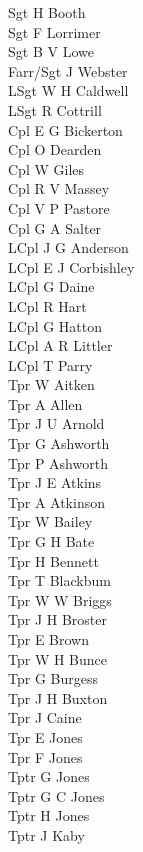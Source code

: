 \begin{multicols}{3}
  \small
  \noindent
  Sgt H Booth \\
  Sgt F Lorrimer \\
  Sgt B V Lowe \\
  Farr/Sgt J Webster \\
  LSgt W H Caldwell \\
  LSgt R Cottrill \\
  Cpl E G Bickerton \\
  Cpl O Dearden \\
  Cpl W Giles \\
  Cpl R V Massey \\
  Cpl V P Pastore \\
  Cpl G A Salter \\
  LCpl J G Anderson \\
  LCpl E J Corbishley \\
  LCpl G Daine \\
  LCpl R Hart \\
  LCpl G Hatton \\
  LCpl A R Littler \\
  LCpl T Parry \\
  Tpr W Aitken \\
  Tpr A Allen \\
  Tpr J U Arnold \\
  Tpr G Ashworth \\
  Tpr P Ashworth \\
  Tpr J E Atkins \\
  Tpr A Atkinson \\
  Tpr W Bailey \\
  Tpr G H Bate \\
  Tpr H Bennett \\
  Tpr T Blackbum \\
  Tpr W W Briggs \\
  Tpr J H Broster \\
  Tpr E Brown \\
  Tpr W H Bunce \\
  Tpr G Burgess \\
  Tpr J H Buxton \\
  Tpr J Caine \\
  Tpr E Jones \\
  Tpr F Jones \\
  Tptr G Jones \\
  Tptr G C Jones \\
  Tptr H Jones \\
  Tptr J Kaby \\

\end{multicols}
